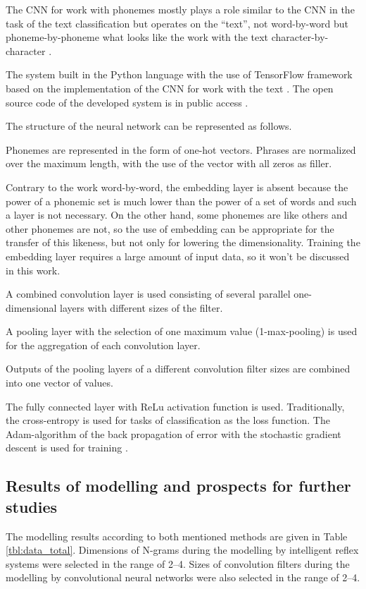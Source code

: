 \documentclass[review,authoryear]{elsarticle}
\begin{document}
The CNN for work with phonemes mostly plays a role similar to the CNN in the task of the text classification \citep{Kim_2014} but operates on the “text”, not word-by-word but phoneme-by-phoneme what looks like the work with the text character-by-character \citep{Zhang_2015}. 

The system built in the Python language with the use of TensorFlow framework based on the implementation of the CNN for work with the text \citep{Britz_2015}. The open source code of the developed system is in public access \citep{code2}. 

The structure of the neural network can be represented as follows. 

Phonemes are represented in the form of one-hot vectors. Phrases are normalized over the maximum length, with the use of the vector with all zeros as filler.

Contrary to the work word-by-word, the embedding layer is absent because the power of a phonemic set is much lower than the power of a set of words and such a layer is not necessary. On the other hand, some phonemes are like others and other phonemes are not, so the use of embedding can be appropriate for the transfer of this likeness, but not only for lowering the dimensionality. Training the embedding layer requires a large amount of input data, so it won’t be discussed in this work. 

A combined convolution layer is used consisting of several parallel one-dimensional layers with different sizes of the filter. 

A pooling layer with the selection of one maximum value (1-max-pooling) is used for the aggregation of each convolution layer. 

Outputs of the pooling layers of a different convolution filter sizes are combined into one vector of values. 

The fully connected layer with ReLu activation function is used. Traditionally, the cross-entropy is used for tasks of classification as the loss function. The Adam-algorithm of the back propagation of error with the stochastic gradient descent is used for training \citep{eng_art4}. 

\subsection{Results of modelling and prospects for further studies}

The modelling results according to both mentioned methods are given in Table \ref{tbl:data_total}. Dimensions of N-grams during the modelling by intelligent reflex systems were selected in the range of 2--4. Sizes of convolution filters during the modelling by convolutional neural networks were also selected in the range of 2--4.
\end{document}
